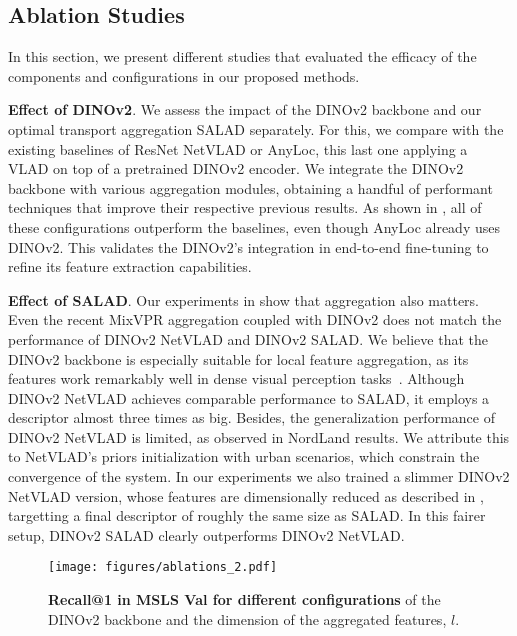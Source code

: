 \documentclass[10pt,twocolumn,letterpaper]{article}
\begin{document}
\subsection{Ablation Studies}
\label{subsec:ablation}


In this section, we present different studies that evaluated the efficacy of the components and configurations in our proposed methods.

\textbf{Effect of DINOv2}. 
We assess the impact of the DINOv2 backbone and our optimal transport aggregation SALAD separately. For this, we compare with the existing baselines of ResNet NetVLAD or AnyLoc, this last one applying a VLAD on top of a pretrained DINOv2 encoder.
We integrate the DINOv2 backbone with various aggregation modules, obtaining a handful of performant techniques that improve their respective previous results. As shown in , all of these configurations outperform the baselines, even though AnyLoc already uses DINOv2. This validates the DINOv2's integration in end-to-end fine-tuning to refine its feature extraction capabilities.

\textbf{Effect of SALAD}. 
Our experiments in  show that aggregation also matters. Even the recent MixVPR aggregation coupled with DINOv2 does not match the performance of DINOv2 NetVLAD and DINOv2 SALAD. We believe that the DINOv2 backbone is especially suitable for local feature aggregation, as its features work remarkably well in dense visual perception tasks~\cite{oquab2023dinov2, kappeler2023few,yao2023vitmatte}. Although DINOv2 NetVLAD achieves comparable performance to SALAD, it employs a descriptor almost three times as big. Besides, the generalization performance of DINOv2 NetVLAD is limited, as observed in NordLand results. We attribute this to NetVLAD's priors initialization with urban scenarios, which constrain the convergence of the system. In our experiments we also trained a slimmer DINOv2 NetVLAD version, whose features are dimensionally reduced as described in , targetting a final descriptor of roughly the same size as SALAD. In this fairer setup, DINOv2 SALAD clearly outperforms DINOv2 NetVLAD.




\begin{figure}[t]
  \centering
   \texttt{[image: figures/ablations\_2.pdf]}
   \caption{\textbf{Recall@1 in MSLS Val for different configurations} of the DINOv2 backbone and the dimension of the aggregated features, $l$.}
   \label{fig:plot_ablations}
\end{figure}\vspace{1em}
\end{document}
